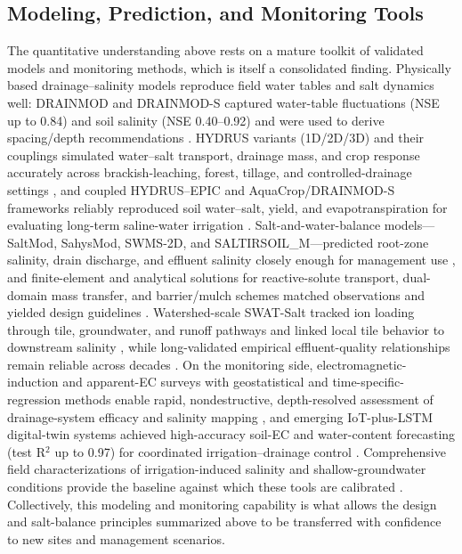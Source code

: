 \subsection{Modeling, Prediction, and Monitoring Tools}

The quantitative understanding above rests on a mature toolkit of validated models and monitoring methods, which is itself a consolidated finding. Physically based drainage--salinity models reproduce field water tables and salt dynamics well: DRAINMOD and DRAINMOD-S captured water-table fluctuations (NSE up to 0.84) and soil salinity (NSE 0.40--0.92) and were used to derive spacing/depth recommendations \parencite{Chen2025,Tian2023,Tian2023c,Tian2024,Davoodi2019,Li2024}. HYDRUS variants (1D/2D/3D) and their couplings simulated water--salt transport, drainage mass, and crop response accurately across brackish-leaching, forest, tillage, and controlled-drainage settings \parencite{Li2023,Dou2022,Wang2024c,Li2026,Jia2023,Liu2022}, and coupled HYDRUS--EPIC and AquaCrop/DRAINMOD-S frameworks reliably reproduced soil water--salt, yield, and evapotranspiration for evaluating long-term saline-water irrigation \parencite{Feng2019,Feng2021,Li2024}. Salt-and-water-balance models---SaltMod, SahysMod, SWMS-2D, and SALTIRSOIL\_M---predicted root-zone salinity, drain discharge, and effluent salinity closely enough for management use \parencite{Bahçeci2006,Bahçeci2007,Yao2017,Qian2021b,Abdelkrim2021}, and finite-element and analytical solutions for reactive-solute transport, dual-domain mass transfer, and barrier/mulch schemes matched observations and yielded design guidelines \parencite{KAMRA1991,KAMRA1994,Zhang2022,Zhang2024,Youngs2000}. Watershed-scale SWAT-Salt tracked ion loading through tile, groundwater, and runoff pathways and linked local tile behavior to downstream salinity \parencite{Addab2022,Liu2026}, while long-validated empirical effluent-quality relationships remain reliable across decades \parencite{JOHNSTON1993,Kelleners2000}. On the monitoring side, electromagnetic-induction and apparent-EC surveys with geostatistical and time-specific-regression methods enable rapid, nondestructive, depth-resolved assessment of drainage-system efficacy and salinity mapping \parencite{Narjary2024,Song2023,Yu2025,Singh2020d,Mirlas2003}, and emerging IoT-plus-LSTM digital-twin systems achieved high-accuracy soil-EC and water-content forecasting (test R$^2$ up to 0.97) for coordinated irrigation--drainage control \parencite{Qin2025}. Comprehensive field characterizations of irrigation-induced salinity and shallow-groundwater conditions provide the baseline against which these tools are calibrated \parencite{Gates2002}. Collectively, this modeling and monitoring capability is what allows the design and salt-balance principles summarized above to be transferred with confidence to new sites and management scenarios.